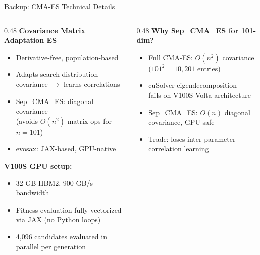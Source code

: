 \documentclass[aspectratio=169,12pt]{beamer}
\begin{document}
\begin{frame}{Backup: CMA-ES Technical Details}
  \begin{columns}[T]
    \begin{column}{0.48\textwidth}
      \textbf{Covariance Matrix Adaptation ES}
      \begin{itemize}
        \item Derivative-free, population-based
        \item Adapts search distribution\\
              covariance $\to$ learns correlations
        \item Sep\_CMA\_ES: diagonal covariance\\
              {\scriptsize (avoids $O(n^2)$ matrix ops for $n=101$)}
        \item evosax: JAX-based, GPU-native
      \end{itemize}

      \vspace{0.5em}
      \textbf{V100S GPU setup:}
      \begin{itemize}
        \item 32 GB HBM2, 900 GB/s bandwidth
        \item Fitness evaluation fully vectorized\\
              via JAX (no Python loops)
        \item 4{,}096 candidates evaluated in\\
              parallel per generation
      \end{itemize}
    \end{column}
    \begin{column}{0.48\textwidth}
      \textbf{Why Sep\_CMA\_ES for 101-dim?}
      \begin{itemize}
        \item Full CMA-ES: $O(n^2)$ covariance\\
              ($101^2 = 10{,}201$ entries)
        \item cuSolver eigendecomposition\\
              fails on V100S Volta architecture
        \item Sep\_CMA\_ES: $O(n)$ diagonal\\
              covariance, GPU-safe
        \item Trade: loses inter-parameter\\
              correlation learning
      \end{itemize}


\end{column}
\end{columns}
\end{frame}
\end{document}
